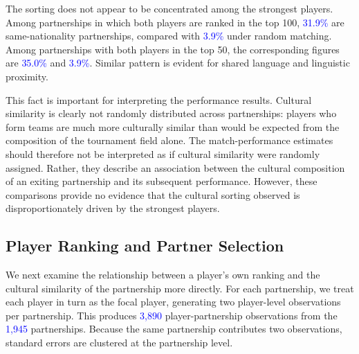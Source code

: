 \documentclass[10pt]{article}
\begin{document}
The sorting does not appear to be concentrated among the strongest players. Among partnerships in which both players are ranked in the top 100, \textcolor{blue}{31.9\%} are same-nationality partnerships, compared with \textcolor{blue}{3.9\%} under random matching. Among partnerships with both players in the top 50, the corresponding figures are \textcolor{blue}{35.0\%} and \textcolor{blue}{3.9\%}.  Similar pattern is evident for shared language and linguistic proximity. 

This fact is important for interpreting the performance results. Cultural similarity is clearly not randomly distributed across partnerships: players who form teams are much more culturally similar than would be expected from the composition of the tournament field alone. The match-performance estimates should therefore not be interpreted as if cultural similarity were randomly assigned. Rather, they describe an association between the cultural composition of an exiting partnership and its subsequent performance. However, these comparisons provide no evidence that the cultural sorting observed is disproportionately driven by the strongest players.

\subsection{Player Ranking and Partner Selection}

We next examine the relationship between a player's own ranking and the cultural similarity of the partnership more directly. For each partnership, we treat each player in turn as the focal player, generating two player-level observations per partnership. This produces \textcolor{blue}{3,890} player-partnership observations from the \textcolor{blue}{1,945} partnerships. Because the same partnership contributes two observations, standard errors are clustered at the partnership level.
\end{document}
